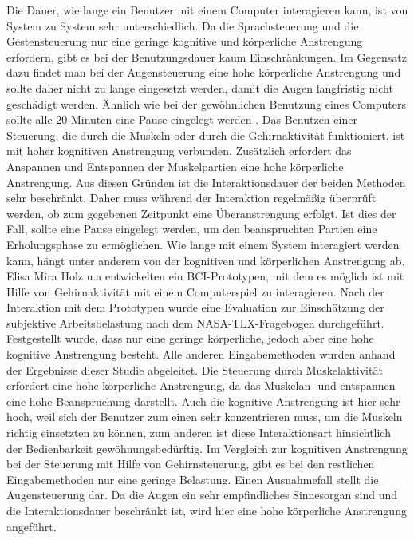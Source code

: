 \newline \newline
Die Dauer, wie lange ein Benutzer mit einem Computer interagieren kann, ist von System zu System sehr unterschiedlich. Da die Sprachsteuerung und die Gestensteuerung nur eine geringe kognitive und körperliche Anstrengung erfordern, gibt es bei der Benutzungsdauer kaum Einschränkungen. Im Gegensatz dazu findet man bei der Augensteuerung eine hohe körperliche Anstrengung und sollte daher nicht zu lange eingesetzt werden, damit die Augen langfristig nicht geschädigt werden. Ähnlich wie bei der gewöhnlichen Benutzung eines Computers sollte alle 20 Minuten eine Pause eingelegt werden \cite{20Methode}. Das Benutzen einer Steuerung, die durch die Muskeln oder durch die Gehirnaktivität funktioniert, ist mit hoher kognitiven Anstrengung verbunden. Zusätzlich erfordert das Anspannen und Entspannen der Muskelpartien eine hohe körperliche Anstrengung. Aus diesen Gründen ist die Interaktionsdauer der beiden Methoden sehr beschränkt. Daher muss während der Interaktion regelmäßig überprüft werden, ob zum gegebenen Zeitpunkt eine Überanstrengung erfolgt. Ist dies der Fall, sollte eine Pause eingelegt werden, um den beanspruchten Partien eine Erholungsphase zu ermöglichen.
\newline \newline
Wie lange mit einem System interagiert werden kann, hängt unter anderem von der kognitiven und körperlichen Anstrengung ab. Elisa Mira Holz u.a \cite{holz2013brain} entwickelten ein BCI-Prototypen, mit dem es möglich ist mit Hilfe von Gehirnaktivität mit einem Computerspiel zu interagieren. Nach der Interaktion mit dem Prototypen wurde eine Evaluation zur Einschätzung der subjektive Arbeitsbelastung nach dem NASA-TLX-Fragebogen durchgeführt. Festgestellt wurde, dass nur eine geringe körperliche, jedoch aber eine hohe kognitive Anstrengung besteht. Alle anderen Eingabemethoden wurden anhand der Ergebnisse dieser Studie abgeleitet. Die Steuerung durch Muskelaktivität erfordert eine hohe körperliche Anstrengung, da das Muskelan- und entspannen eine hohe Beanspruchung darstellt. Auch die kognitive Anstrengung ist hier sehr hoch, weil sich der Benutzer zum einen sehr konzentrieren muss, um die Muskeln richtig einsetzten zu können, zum anderen ist diese Interaktionsart hinsichtlich der Bedienbarkeit gewöhnungsbedürftig. Im Vergleich zur kognitiven Anstrengung bei der Steuerung mit Hilfe von Gehirnsteuerung, gibt es bei den restlichen Eingabemethoden nur eine geringe Belastung. Einen Ausnahmefall stellt die Augensteuerung dar. Da die Augen ein sehr empfindliches Sinnesorgan sind und die Interaktionsdauer beschränkt ist, wird hier eine hohe körperliche Anstrengung angeführt.
